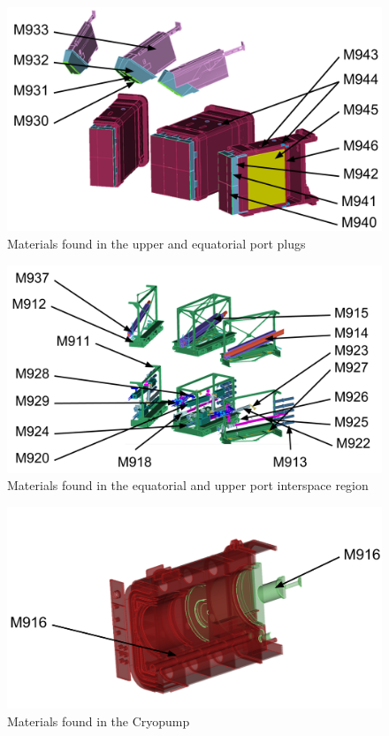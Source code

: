 \documentclass[12pt]{article}
\begin{document}
\begin{figure}[p]
  \centering
  \includegraphics[scale=0.32]{../plots/cad/mats/label_4.png}
  \caption{Materials found in the upper and equatorial port plugs }
  \label{fig:material_assign_3}
\end{figure}

\begin{figure}[p]
  \centering
  \includegraphics[scale=0.32]{../plots/cad/mats/label_5.png}
  \caption{Materials found in the equatorial and
           upper port interspace region}
  \label{fig:material_assign_4}
\end{figure}

\begin{figure}[p]
  \centering
  \includegraphics[scale=0.32]{../plots/cad/mats/label_6.png}
  \caption{Materials found in the Cryopump}
  \label{fig:material_assign_5}
\end{figure}
\end{document}
